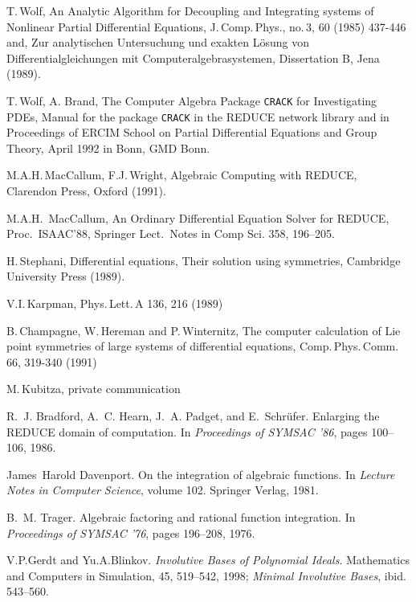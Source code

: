 \begin{thebibliography}{999}
 T.\,Wolf, An Analytic Algorithm for Decoupling and Integrating
systems of Nonlinear Partial Differential Equations, J.\,Comp.\,Phys.,
no.\,3, 60 (1985) 437-446 and, Zur analytischen Untersuchung und exakten
L\"{o}sung von Differentialgleichungen mit Computeralgebrasystemen,
Dissertation B, Jena (1989).

 T.\,Wolf, A. Brand, The Computer Algebra Package \texttt{CRACK}
      for Investigating PDEs, Manual for the package \texttt{CRACK} in the REDUCE
      network library and in Proceedings of ERCIM School on Partial 
      Differential Equations and Group Theory, April 1992 in Bonn, GMD Bonn.

 M.A.H.\,MacCallum, F.J.\,Wright, Algebraic Computing with REDUCE,
Clarendon Press, Oxford (1991).

 M.A.H.\, MacCallum, An Ordinary Differential Equation
Solver for REDUCE, Proc.\, ISAAC'88, Springer Lect.\, Notes in Comp Sci.
358, 196--205.

 H.\,Stephani, Differential equations, Their solution using
symmetries, Cambridge University Press (1989).

 V.I.\,Karpman, Phys.\,Lett.\,A 136, 216 (1989)

 B.\,Champagne, W.\,Hereman and P.\,Winternitz, The computer
      calculation of Lie point symmetries of large systems of differential
      equations, Comp.\,Phys.\,Comm.\,66, 319-340 (1991)

 M.\,Kubitza, private communication


R.~J. Bradford, A.~C. Hearn, J.~A. Padget, and E.~Schr{\"u}fer.
\newblock Enlarging the {REDUCE} domain of computation.
\newblock In \emph{Proceedings of {SYMSAC} '86}, pages 100--106, 1986.

James~Harold Davenport.
\newblock On the integration of algebraic functions.
\newblock In \emph{Lecture Notes in Computer Science}, volume 102. Springer
  Verlag, 1981.

B.~M. Trager.
\newblock Algebraic factoring and rational function integration.
\newblock In \emph{Proceedings of {SYMSAC} '76}, pages 196--208, 1976.


 V.P.Gerdt and Yu.A.Blinkov. \emph{Involutive Bases of Polynomial Ideals}. 
Mathematics and Computers in Simulation, 45, 519--542, 1998; \emph{Minimal Involutive Bases}, ibid. 543--560.
 

\end{thebibliography}
